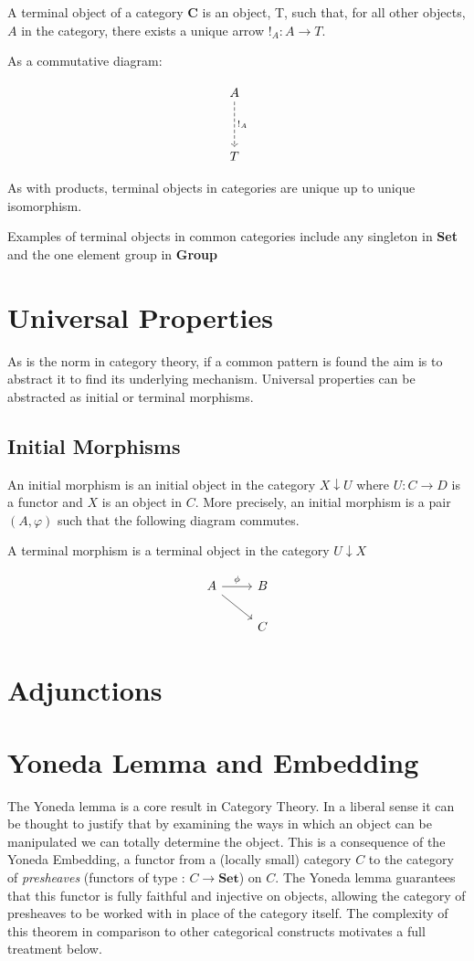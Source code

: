 \documentclass[a4paper,12pt]{article}
\begin{document}
A terminal object of a category \textbf{C} is an object, T, such that, for all
other objects, $A$ in the category, there exists a unique arrow $!_{A}: A
\rightarrow T$.

As a commutative diagram:

\[\begin{tikzcd}[sep=huge]
A \arrow[d, "!_A", dashed] \\
T
\end{tikzcd}\]

As with products, terminal objects in categories are unique up to unique
isomorphism.

Examples of terminal objects in common categories include any singleton in
\textbf{Set} and the one element group in \textbf{Group}


\section{Universal Properties}
As is the norm in category theory, if a common pattern is found the aim is to
abstract it to find its underlying mechanism. Universal properties can
be abstracted as initial or terminal morphisms.

\subsection{Initial Morphisms}
An initial morphism is an initial object in the category $X \downarrow U$ where
$U : C \rightarrow D$ is a functor and $X$ is an object in $C$. More precisely,
an initial morphism is a pair $(A, \varphi)$ such that the following diagram
commutes.

A terminal morphism is a terminal object in the category $U \downarrow X$

\[\begin{tikzcd}
    A \arrow[rd] \arrow[r, "\phi"] & B \\
                                   & C
\end{tikzcd}\]

\section{Adjunctions}
\section{Yoneda Lemma and Embedding}
The Yoneda lemma is a core result in Category Theory. In a liberal sense it can
be thought to justify that by examining the ways in which an object can be
manipulated we can totally determine the object. This is a consequence of the
Yoneda Embedding, a functor from a (locally small) category $C$ to the category of
\textit{presheaves} (functors of type : $C \rightarrow \textbf{Set}$) on $C$.
The Yoneda lemma guarantees that this functor is fully faithful and injective on
objects, allowing the category of presheaves to be worked with in place of the
category itself. The complexity of this theorem in comparison to other
categorical constructs motivates a full treatment below.
\end{document}

